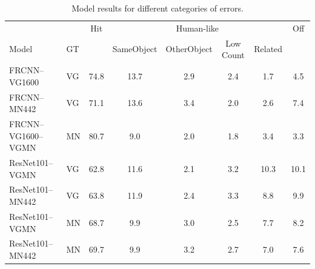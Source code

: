 \begin{table}[t]
	\centering
	\small
\begin{tabular}{ll||c|cccc|c}
	\toprule
	  &  & Hit & \multicolumn{4}{c|}{Human-like} & Off \\
	Model &  GT &  & SameObject &  OtherObject &  Low Count &  Related &   \\
	\midrule
	FRCNN--VG1600&VG &         74.8 &                13.7 &                  2.9 &              2.4 &              1.7 &          4.5 \\
	FRCNN--MN442&VG &         71.1 &                13.6 &                  3.4 &              2.0 &              2.6 &          7.4 \\
	\midrule
	FRCNN--VG1600--VGMN&MN &         80.7 &                 9.0 &                  2.0 &              1.8 &              3.4 &          3.3 \\
	\midrule
	ResNet101--VGMN&VG &         62.8 &                11.6 &                  2.1 &              3.2 &             10.3 &         10.1 \\
	ResNet101--MN442&VG &         63.8 &                11.9 &                  2.4 &              3.3 &              8.8 &          9.9 \\
	ResNet101--VGMN&MN &         68.7 &                 9.9 &                  3.0 &              2.5 &              7.7 &          8.2 \\
	ResNet101--MN442&MN &         69.7 &                 9.9 &                  3.2 &              2.7 &              7.0 &          7.6 \\	
	\bottomrule
\end{tabular}
\caption{Model results for different categories of errors. \label{tab:humanlike}}
\end{table}

